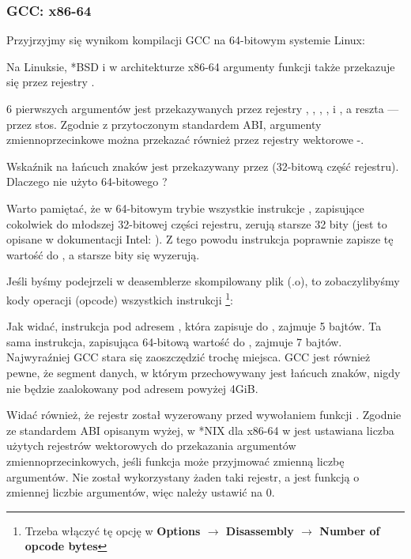 \subsubsection{GCC: x86-64}

Przyjrzyjmy się wynikom kompilacji GCC na 64-bitowym systemie Linux:



Na Linuksie, *BSD i \MacOSX w architekturze x86-64 argumenty funkcji także przekazuje się przez rejestry \SysVABI.

6 pierwszych argumentów jest przekazywanych przez rejestry \RDI, \RSI, \RDX, \RCX,  i , a reszta --- przez stos.
Zgodnie z przytoczonym standardem ABI, argumenty zmiennoprzecinkowe można przekazać również przez rejestry wektorowe -.

Wskaźnik na łańcuch znaków jest przekazywany przez \EDI (32-bitową część rejestru). Dlaczego nie użyto 64-bitowego \RDI?

Warto pamiętać, że w 64-bitowym trybie wszystkie instrukcje \MOV, zapisujące cokolwiek do młodszej 32-bitowej części rejestru, zerują starsze 32 bity (jest to opisane w dokumentacji Intel: ).
Z tego powodu instrukcja  poprawnie zapisze tę wartość do \RAX, a starsze bity się wyzerują.

Jeśli byśmy podejrzeli w deasemblerze \IDA skompilowany plik (.o), to zobaczylibyśmy kody operacji (opcode) wszystkich instrukcji
\footnote{Trzeba włączyć tę opcję w \textbf{Options $\rightarrow$ Disassembly $\rightarrow$ Number of opcode bytes}}:



\label{hw_EDI_instead_of_RDI}
Jak widać, instrukcja \MOV pod adresem , która zapisuje do \EDI, zajmuje 5 bajtów.
Ta sama instrukcja, zapisująca 64-bitową wartość do \RDI, zajmuje 7 bajtów.
Najwyraźniej GCC stara się zaoszczędzić trochę miejsca.
GCC jest również pewne, że segment danych, w którym przechowywany jest łańcuch znaków, nigdy nie będzie zaalokowany pod adresem powyżej 4\gls{GiB}.

\label{SysVABI_input_EAX}
Widać również, że rejestr \EAX został wyzerowany przed wywołaniem funkcji \printf.
Zgodnie ze standardem \ac{ABI} opisanym wyżej, w *NIX dla x86-64 w \EAX jest ustawiana liczba użytych rejestrów wektorowych do przekazania argumentów zmiennoprzecinkowych, jeśli funkcja może przyjmować zmienną liczbę argumentów.
Nie został wykorzystany żaden taki rejestr, a \printf jest funkcją o zmiennej liczbie argumentów, więc należy ustawić \EAX na 0.
